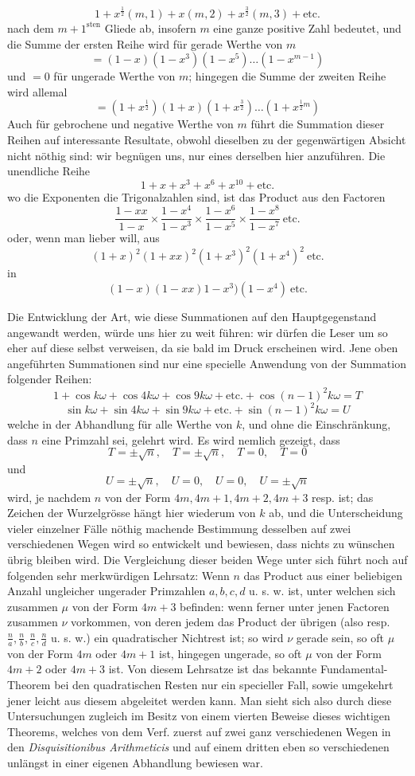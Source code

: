\[
1+x^{\frac12}(m,1)+x(m,2)+x^{\frac32}(m,3)+\text{etc.}
\]
nach dem $m+1^{\mathrm{sten}}$ Gliede ab, insofern $m$ eine ganze positive Zahl bedeutet, und die Summe der ersten Reihe wird für gerade Werthe von $m$
\[
=(1-x)(1-x^3)(1-x^5)\ldots(1-x^{m-1})
\]
und $=0$ für ungerade Werthe von $m$; hingegen die Summe der zweiten Reihe wird allemal
\[
=(1+x^{\frac12})(1+x)(1+x^{\frac32})\ldots(1+x^{\frac12m})
\]
Auch für gebrochene und negative Werthe von $m$ führt die Summation dieser Reihen auf interessante Resultate, obwohl dieselben zu der gegenwärtigen Absicht nicht nöthig sind: wir begnügen uns, nur eines derselben hier anzuführen. Die unendliche Reihe
\[
1+x+x^3+x^6+x^{10}+\text{etc.}
\]
wo die Exponenten die Trigonalzahlen sind, ist das Product aus den Factoren
\[
\frac{1-xx}{1-x}\times\frac{1-x^4}{1-x^3}\times\frac{1-x^6}{1-x^5}\times\frac{1-x^8}{1-x^7}\ \text{etc.}
\]
oder, wenn man lieber will, aus
\[
(1+x)^2(1+xx)^2(1+x^3)^2(1+x^4)^2\ \text{etc.}
\]
in
\[
(1-x)(1-xx)1-x^3)(1-x^4)\ \text{etc.}
\]

Die Entwicklung der Art, wie diese Summationen auf den Hauptgegenstand angewandt werden, würde uns hier zu weit führen: wir dürfen die Leser um so eher auf diese selbst verweisen, da sie bald im Druck erscheinen wird. Jene oben angeführten Summationen sind nur eine specielle Anwendung von der Summation folgender Reihen:
\[
1+\cos k\omega+\cos4k\omega+\cos9k\omega+\text{etc.}+\cos(n-1)^2k\omega=T
\]
\[
\sin k\omega+\sin4k\omega+\sin9k\omega+\text{etc.}+\sin(n-1)^2k\omega=U
\]
welche in der Abhandlung für alle Werthe von $k$, und ohne die Einschränkung,
%
dass $n$ eine Primzahl sei, gelehrt wird. Es wird nemlich gezeigt, dass
\[
T=\pm\surd n,\quad T=\pm\surd n,\quad T=0,\quad T=0
\]
und
\[
U=\pm\surd n,\quad U=0,\quad U=0,\quad U=\pm\surd n
\]
wird, je nachdem $n$ von der Form $4m,4m+1,4m+2,4m+3$ resp. ist; das Zeichen der Wurzelgrösse hängt hier wiederum von $k$ ab, und die Unterscheidung vieler einzelner Fälle nöthig machende Bestimmung desselben auf zwei verschiedenen Wegen wird so entwickelt und bewiesen, dass nichts zu wünschen übrig bleiben wird. Die Vergleichung dieser beiden Wege unter sich führt noch auf folgenden sehr merkwürdigen Lehrsatz: Wenn $n$ das Product aus einer beliebigen Anzahl ungleicher ungerader Primzahlen $a,b,c,d$ u. s. w. ist, unter welchen sich zusammen $\mu$ von der Form $4m+3$ befinden: wenn ferner unter jenen Factoren zusammen $\nu$ vorkommen, von deren jedem das Product der übrigen (also resp. $\frac na,\frac nb,\frac nc,\frac nd$ u. s. w.) ein quadratischer Nichtrest ist; so wird $\nu$ gerade sein, so oft $\mu$ von der Form $4m$ oder $4m+1$ ist, hingegen ungerade, so oft $\mu$ von der Form $4m+2$ oder $4m+3$ ist. Von diesem Lehrsatze ist das bekannte Fundamental-Theorem bei den quadratischen Resten nur ein specieller Fall, sowie umgekehrt jener leicht aus diesem abgeleitet werden kann. Man sieht sich also durch diese Untersuchungen zugleich im Besitz von einem vierten Beweise dieses wichtigen Theorems, welches von dem Verf. zuerst auf zwei ganz verschiedenen Wegen in den \emph{Disquisitionibus Arithmeticis} und auf einem dritten eben so verschiedenen unlängst in einer eigenen Abhandlung bewiesen war.

